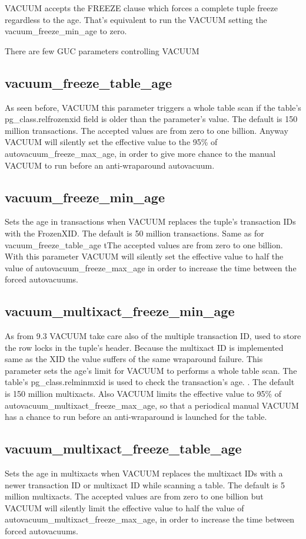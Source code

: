 VACUUM accepts the FREEZE  clause which forces a complete tuple freeze 
regardless to the age. That's equivalent to run the VACUUM setting the vacuum\_freeze\_min\_age to 
zero.

There are few GUC parameters controlling VACUUM

\subsection{vacuum\_freeze\_table\_age}
As seen before, VACUUM this parameter triggers a whole table scan if the table's 
pg\_class.relfrozenxid field is older than the parameter's value. The default is 150 million 
transactions. The accepted values are from zero to one billion. Anyway VACUUM will silently set the 
effective value to the 95\% of autovacuum\_freeze\_max\_age, in order to give more chance to the 
manual VACUUM to run before an anti-wraparound autovacuum.

\subsection{vacuum\_freeze\_min\_age}
Sets the age in transactions when VACUUM replaces the tuple's transaction IDs with the 
FrozenXID. The default is 50 million transactions. Same as for vacuum\_freeze\_table\_age tThe 
accepted values are from zero to one billion. With this parameter VACUUM will silently set the 
effective value to half the value of autovacuum\_freeze\_max\_age in order to increase the time 
between the forced autovacuums.

\subsection{vacuum\_multixact\_freeze\_min\_age}
As from 9.3 VACUUM take care also of the multiple transaction ID, used to store the row locks in 
the tuple's header.  Because the multixact ID is implemented same as the XID 
the value suffers of the same wraparound failure. This 
parameter sets the age's limit for VACUUM to performs a whole table scan. The  table's 
pg\_class.relminmxid is used to check the transaction's age. . The default is 150 million 
multixacts. Also VACUUM limits the effective value to 95\% of 
autovacuum\_multixact\_freeze\_max\_age, so that a periodical manual VACUUM has a chance to run 
before an anti-wraparound is launched for the table.

\subsection{vacuum\_multixact\_freeze\_table\_age}
Sets the age in multixacts when VACUUM replaces the multixact IDs with a newer transaction ID or 
multixact ID while scanning a table. The default is 5 million multixacts. The accepted values 
are from zero to one billion but VACUUM will silently limit the effective value to half the value 
of autovacuum\_multixact\_freeze\_max\_age, in order to increase the time between forced 
autovacuums.

